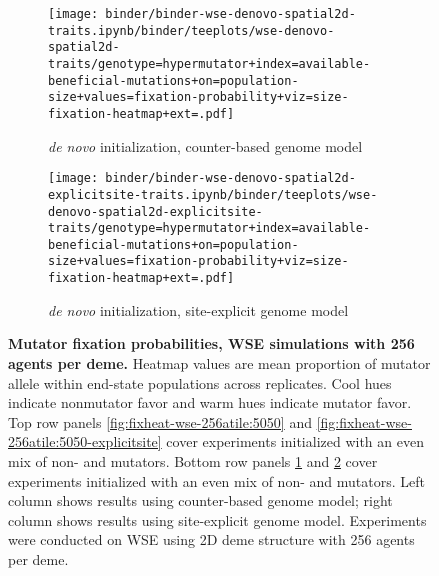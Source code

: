 \begin{figure}[h]
\begin{subfigure}[b]{0.5\linewidth}
    \begin{minipage}{\linewidth}
          \texttt{[image: binder/binder-wse-denovo-spatial2d-traits.ipynb/binder/teeplots/wse-denovo-spatial2d-traits/genotype=hypermutator+index=available-beneficial-mutations+on=population-size+values=fixation-probability+viz=size-fixation-heatmap+ext=.pdf]}%
    \end{minipage}
    \begin{minipage}{\linewidth}
    \caption{\textit{de novo} initialization, counter-based genome model}
    \label{fig:fixheat-wse-256atile:denovo}
    \end{minipage}%
\end{subfigure}%
\begin{subfigure}[b]{0.5\linewidth}
    \begin{minipage}{\linewidth}
          \texttt{[image: binder/binder-wse-denovo-spatial2d-explicitsite-traits.ipynb/binder/teeplots/wse-denovo-spatial2d-explicitsite-traits/genotype=hypermutator+index=available-beneficial-mutations+on=population-size+values=fixation-probability+viz=size-fixation-heatmap+ext=.pdf]}%
    \end{minipage}
    \begin{minipage}{\linewidth}
    \caption{\textit{de novo} initialization, site-explicit genome model}
    \label{fig:fixheat-wse-256atile:denovo-explicitsite}
    \end{minipage}%
\end{subfigure}

  \begin{minipage}{\linewidth}
    \caption{%
\textbf{Mutator fixation probabilities, WSE simulations with 256 agents per deme.}
\footnotesize
Heatmap values are mean proportion of mutator allele within end-state populations across replicates.
Cool hues indicate nonmutator favor and warm hues indicate mutator favor.
Top row panels \ref{fig:fixheat-wse-256atile:5050} and \ref{fig:fixheat-wse-256atile:5050-explicitsite} cover experiments initialized with an even mix of non- and mutators.
Bottom row panels \ref{fig:fixheat-wse-256atile:denovo} and \ref{fig:fixheat-wse-256atile:denovo-explicitsite} cover experiments initialized with an even mix of non- and mutators.
Left column shows results using counter-based genome model; right column shows results using site-explicit genome model.
Experiments were conducted on WSE using 2D deme structure with 256 agents per deme.
    }
    \label{fig:fixheat-wse-256atile}
  \end{minipage}
\end{figure}
